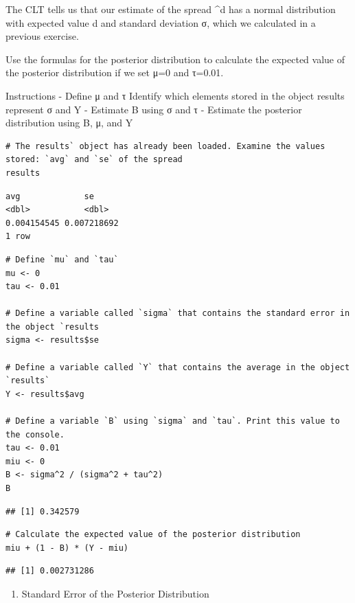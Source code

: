 \documentclass[
]{article}
\providecommand{\tightlist}{%
  \setlength{\itemsep}{0pt}\setlength{\parskip}{0pt}}
\begin{document}
The CLT tells us that our estimate of the spread \^{}d has a normal
distribution with expected value d and standard deviation σ, which we
calculated in a previous exercise.

Use the formulas for the posterior distribution to calculate the
expected value of the posterior distribution if we set μ=0 and τ=0.01.

Instructions - Define μ and τ Identify which elements stored in the
object results represent σ and Y - Estimate B using σ and τ - Estimate
the posterior distribution using B, μ, and Y

\begin{verbatim}
# The results` object has already been loaded. Examine the values stored: `avg` and `se` of the spread
results
\end{verbatim}

\begin{verbatim}
avg             se
<dbl>           <dbl>
0.004154545 0.007218692
1 row
\end{verbatim}

\begin{verbatim}
# Define `mu` and `tau`
mu <- 0
tau <- 0.01

# Define a variable called `sigma` that contains the standard error in the object `results
sigma <- results$se

# Define a variable called `Y` that contains the average in the object `results`
Y <- results$avg

# Define a variable `B` using `sigma` and `tau`. Print this value to the console.
tau <- 0.01
miu <- 0
B <- sigma^2 / (sigma^2 + tau^2)
B
\end{verbatim}

\begin{verbatim}
## [1] 0.342579
\end{verbatim}

\begin{verbatim}
# Calculate the expected value of the posterior distribution
miu + (1 - B) * (Y - miu)
\end{verbatim}

\begin{verbatim}
## [1] 0.002731286
\end{verbatim}

\begin{enumerate}
\def\labelenumi{\arabic{enumi}.}
\setcounter{enumi}{8}
\tightlist
\item
  Standard Error of the Posterior Distribution
\end{enumerate}
\end{document}
